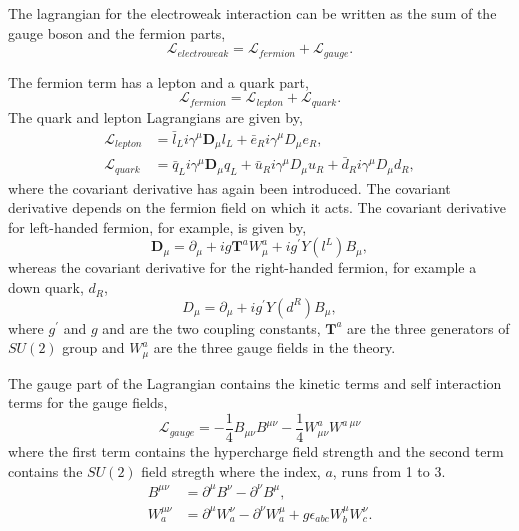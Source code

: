 The lagrangian for the electroweak interaction can be written as the sum of the
gauge boson and the fermion parts,
\begin{equation}
\mathcal{L}_{electroweak} = 
\mathcal{L}_{fermion}
+ \mathcal{L}_{gauge}.
\end{equation}

The fermion term has a lepton and a quark part,
\begin{equation}
\mathcal{L}_{fermion} =
 \mathcal{L}_{lepton}
+ \mathcal{L}_{quark}.
\end{equation}
The quark and lepton Lagrangians are given by,
\begin{align*}
\mathcal{L}_{lepton} &= 
\bar{l}_{L} i \gamma^{\mu} \mathbf{D}_{\mu} l_{L} +
\bar{e}_{R} i \gamma^{\mu} D_{\mu} e_{R}, \\
\mathcal{L}_{quark} &= 
\bar{q}_{L} i \gamma^{\mu} \mathbf{D}_{\mu} q_{L} +
\bar{u}_{R} i \gamma^{\mu} D_{\mu} u_{R} +
\bar{d}_{R} i \gamma^{\mu} D_{\mu} d_{R},
\end{align*}
where the covariant derivative has again been introduced.
The covariant derivative depends on the fermion field on which it acts. The covariant derivative
for left-handed fermion, for example, is given by,
\begin{equation}
\mathbf{D}_\mu 
= \partial_\mu 
+ ig\mathbf{T}^{a}W_{\mu}^{a}
+ ig^{\prime}Y(l^{L})B_{\mu},
\end{equation}
whereas the covariant derivative for the right-handed fermion, for example a
down quark, $d_R$,
\begin{equation}
D_\mu = \partial_\mu + ig^{\prime}Y(d^{R})B_{\mu},
\end{equation}
where $g^\prime$ and $g$ and are the two coupling constants,
$\mathbf{T}^{a}$ are the three generators of $SU(2)$ group and $W^{a}_{\mu}$ are
the three gauge fields in the theory.

The gauge part of the Lagrangian contains the kinetic terms and self interaction
terms for the gauge fields,
\begin{equation}
\mathcal{L}_{gauge} = 
- \frac{1}{4} B_{\mu\nu} B^{\mu\nu}
- \frac{1}{4} W^{a}_{\mu\nu} W^{a~\mu\nu}
\end{equation}
where the first term contains the hypercharge field strength and the second term 
contains the $SU(2)$ field stregth where the index, $a$, runs from 1 to 3.
\begin{align*}
B^{\mu\nu}     &= \partial^{\mu} B^{\nu} - \partial^{\nu} B^{\mu},\\
W_{a}^{\mu\nu} &= \partial^{\mu} W_{a}^{\nu} - \partial^{\nu} W_{a}^{\mu} 
                + g \epsilon_{abc} W_{b}^{\mu} W_{c}^{\nu}.
\end{align*}

